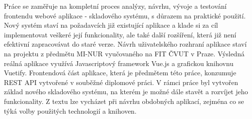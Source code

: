 Práce se zaměřuje na kompletní proces analýzy, návrhu, vývoje a testování frontendu webové aplikace - skladového systému, s důrazem na praktické použití. Nový systém staví na požadavcích již existující aplikace a klade si za cíl implementovat veškeré její funkcionality, ale také další rozšíření, která již není efektivní zapracovávat do staré verze. Návrh uživatelského rozhraní aplikace staví na projektu z předmětu MI-NUR vyučovaného na FIT ČVUT v Praze. Výsledná reálná aplikace využívá Javascriptový framework Vue.js a grafickou knihovnu Vuetify. Frontendová část aplikace, která je předmětem této práce, konzumuje REST API vytvořené v souběžné diplomové práci. V rámci práce byl vytvořen základ nového skladového systému, na kterém je možné dále stavět a rozvíjet jeho funkcionality. Z textu lze vycházet při návrhu obdobných aplikací, zejména co se týká volby použitých technologií a knihoven.
